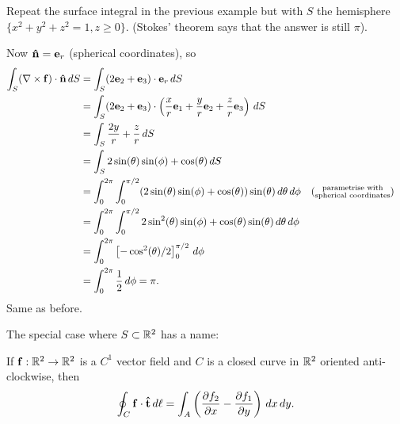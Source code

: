 \documentclass[10pt, a4paper]{article}
\begin{document}
\begin{example}
    Repeat the surface integral in the previous example but with $S$ the hemisphere $\{x ^ 2 + y ^ 2 + z ^ 2 = 1, z \geq 0\}$.
    (Stokes' theorem says that the answer is still $\pi$).

    Now $\hvec{n} = \vec{e}_r$
    (spherical coordinates),
    so
    \begin{align*}
        \int_{S}(\bnabla \times \vec{f})\cdot\hvec{n}\,dS &= \int_{S}(2\vec{e}_2 + \vec{e}_3)\cdot\vec{e}_r\,dS \\
        &= \int_{S}(2\vec{e}_2 + \vec{e}_3)\cdot\left(\frac{x}{r}\vec{e}_1 + \frac{y}{r}\vec{e}_2 + \frac{z}{r}\vec{e}_3\right)\,dS \\
        &= \int_{S}\frac{2y}{r} + \frac{z}{r}\,dS \\
        &= \int_{S}2\sin(\theta)\sin(\phi) + \cos(\theta)\,dS \\
        &= \int_{0}^{2\pi}\int_{0}^{\pi / 2}(2\sin(\theta)\sin(\phi) + \cos(\theta))\sin(\theta)\,d\theta\,d\phi &&(\substack{\text{parametrise with} \\\text{spherical coordinates}}) \\
        &= \int_{0}^{2\pi}\int_{0}^{\pi / 2}2\sin ^ 2(\theta)\sin(\phi) + \cos(\theta)\sin(\theta)\,d\theta\,d\phi \\
        &= \int_{0}^{2\pi}\left[-\cos ^ 2(\theta) / 2\right]_{0}^{\pi / 2}\,d\phi \\
        &= \int_{0}^{2\pi}\frac{1}{2}\,d\phi = \pi.
    \end{align*}
    Same as before.
\end{example}

The special case where $S \subset \R ^ 2$ has a name:
\begin{corollary}
    If $\vec{f} : \R ^ 2 \to \R ^ 2$ is a $C ^ {1}$ vector field and $C$ is a closed curve in $\R ^ 2$ oriented anti-clockwise,
    then
    \[
    \oint_{C}\vec{f}\cdot\hvec{t}\,d\ell = \int_{A}\left(\pd[f_2]{x} - \pd[f_1]{y}\right)\,dx\,dy.
    \]
\end{corollary}
\end{document}
